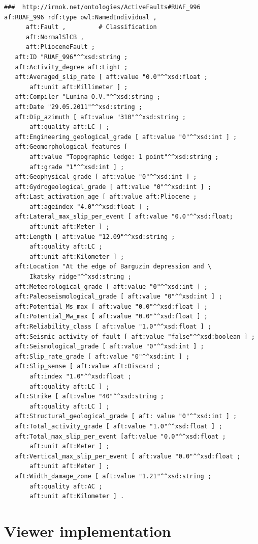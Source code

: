 \documentclass[
]{ceurart}
\begin{document}
\begin{multicols}{2}\tiny
  \begin{verbatim}
###  http://irnok.net/ontologies/ActiveFaults#RUAF_996
af:RUAF_996 rdf:type owl:NamedIndividual ,
      aft:Fault ,         # Classification
      aft:NormalSlCB ,
      aft:PlioceneFault ;
   aft:ID "RUAF_996"^^xsd:string ;
   aft:Activity_degree aft:Light ;
   aft:Averaged_slip_rate [ aft:value "0.0"^^xsd:float ;
       aft:unit aft:Millimeter ] ;
   aft:Compiler "Lunina O.V."^^xsd:string ;
   aft:Date "29.05.2011"^^xsd:string ;
   aft:Dip_azimuth [ aft:value "310"^^xsd:string ;
       aft:quality aft:LC ] ;
   aft:Engineering_geological_grade [ aft:value "0"^^xsd:int ] ;
   aft:Geomorphological_features [
       aft:value "Topographic ledge: 1 point"^^xsd:string ;
       aft:grade "1"^^xsd:int ] ;
   aft:Geophysical_grade [ aft:value "0"^^xsd:int ] ;
   aft:Gydrogeological_grade [ aft:value "0"^^xsd:int ] ;
   aft:Last_activation_age [ aft:value aft:Pliocene ;
       aft:ageindex "4.0"^^xsd:float ] ;
   aft:Lateral_max_slip_per_event [ aft:value "0.0"^^xsd:float;
       aft:unit aft:Meter ] ;
   aft:Length [ aft:value "12.09"^^xsd:string ;
       aft:quality aft:LC ;
       aft:unit aft:Kilometer ] ;
   aft:Location "At the edge of Barguzin depression and \
       Ikatsky ridge"^^xsd:string ;
   aft:Meteorological_grade [ aft:value "0"^^xsd:int ] ;
   aft:Paleoseismological_grade [ aft:value "0"^^xsd:int ] ;
   aft:Potential_Ms_max [ aft:value "0.0"^^xsd:float ] ;
   aft:Potential_Mw_max [ aft:value "0.0"^^xsd:float ] ;
   aft:Reliability_class [ aft:value "1.0"^^xsd:float ] ;
   aft:Seismic_activity_of_fault [ aft:value "false"^^xsd:boolean ] ;
   aft:Seismological_grade [ aft:value "0"^^xsd:int ] ;
   aft:Slip_rate_grade [ aft:value "0"^^xsd:int ] ;
   aft:Slip_sense [ aft:value aft:Discard ;
       aft:index "1.0"^^xsd:float ;
       aft:quality aft:LC ] ;
   aft:Strike [ aft:value "40"^^xsd:string ;
       aft:quality aft:LC ] ;
   aft:Structural_geological_grade [ aft: value "0"^^xsd:int ] ;
   aft:Total_activity_grade [ aft:value "1.0"^^xsd:float ] ;
   aft:Total_max_slip_per_event [aft:value "0.0"^^xsd:float ;
       aft:unit aft:Meter ] ;
   aft:Vertical_max_slip_per_event [ aft:value "0.0"^^xsd:float ;
       aft:unit aft:Meter ] ;
   aft:Width_damage_zone [ aft:value "1.21"^^xsd:string ;
       aft:quality aft:AC ;
       aft:unit aft:Kilometer ] .
\end{verbatim}
\end{multicols}

\section{Viewer implementation}
\end{document}

